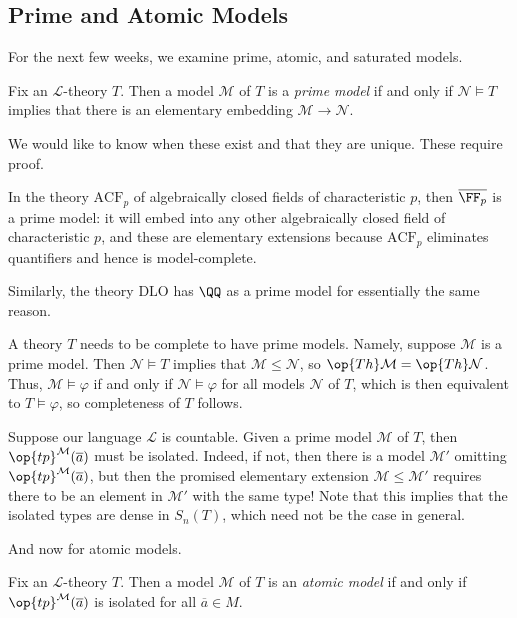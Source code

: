 \documentclass[../notes.tex]{subfiles}
\begin{document}
\subsection{Prime and Atomic Models}
For the next few weeks, we examine prime, atomic, and saturated models.
\begin{definition}[prime]
	Fix an $\mathcal L$-theory $T$. Then a model $\mathcal M$ of $T$ is a \textit{prime model} if and only if $\mathcal N\models T$ implies that there is an elementary embedding $\mathcal M\to\mathcal N$.
\end{definition}
We would like to know when these exist and that they are unique. These require proof.
\begin{example}
	In the theory $\mathrm{ACF}_p$ of algebraically closed fields of characteristic $p$, then $\overline{\FF_p}$ is a prime model: it will embed into any other algebraically closed field of characteristic $p$, and these are elementary extensions because $\mathrm{ACF}_p$ eliminates quantifiers and hence is model-complete.
\end{example}
\begin{example}
	Similarly, the theory $\mathrm{DLO}$ has $\QQ$ as a prime model for essentially the same reason.
\end{example}
\begin{remark}
	A theory $T$ needs to be complete to have prime models. Namely, suppose $\mathcal M$ is a prime model. Then $\mathcal N\models T$ implies that $\mathcal M\le\mathcal N$, so $\op{Th}\mathcal M=\op{Th}\mathcal N$. Thus, $\mathcal M\models\varphi$ if and only if $\mathcal N\models\varphi$ for all models $\mathcal N$ of $T$, which is then equivalent to $T\models\varphi$, so completeness of $T$ follows.
\end{remark}
\begin{remark} \label{rem:prime-implies-atomic}
	Suppose our language $\mathcal L$ is countable. Given a prime model $\mathcal M$ of $T$, then $\op{tp}^{\mathcal M}(\overline a)$ must be isolated. Indeed, if not, then there is a model $\mathcal M'$ omitting $\op{tp}^{\mathcal M}(\overline a)$, but then the promised elementary extension $\mathcal M\le\mathcal M'$ requires there to be an element in $\mathcal M'$ with the same type! Note that this implies that the isolated types are dense in $S_n(T)$, which need not be the case in general.
\end{remark}
And now for atomic models.
\begin{definition}[atomic]
	Fix an $\mathcal L$-theory $T$. Then a model $\mathcal M$ of $T$ is an \textit{atomic model} if and only if $\op{tp}^{\mathcal M}(\overline a)$ is isolated for all $\overline a\in M$.
\end{definition}
\end{document}
